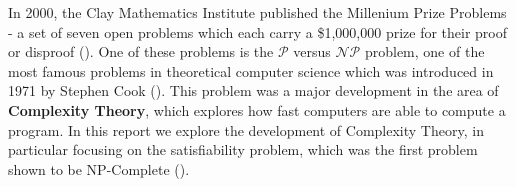 In 2000, the Clay Mathematics Institute published the Millenium Prize Problems - a set of seven open problems which each carry a \$1,000,000 prize for their proof or disproof (\cite{JaffeArthur2006}). One of these problems is the $\mathcal{P}$ versus $\mathcal{NP}$ problem, one of the most famous problems in theoretical computer science which was introduced in 1971 by Stephen Cook (\cite{CookStephenA.1971Tcot}). This problem was a major development in the area of \textbf{Complexity Theory}, which explores how fast computers are able to compute a program. In this report we explore the development of Complexity Theory, in particular focusing on the satisfiability problem, which was the first problem shown to be NP-Complete (\cite{GareyMichaelR1979Cai:}).